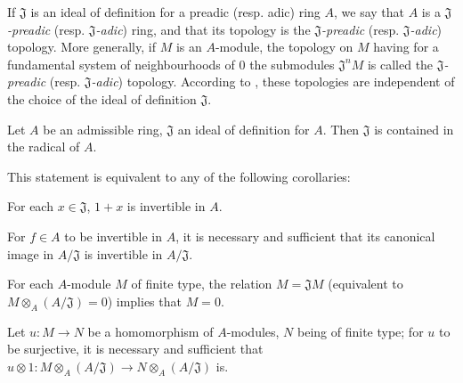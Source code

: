 If $\mathfrak{J}$ is an ideal of definition for a preadic (resp. adic) ring
$A$, we say that $A$ is a \emph{$\mathfrak{J}$-preadic}
(resp. \emph{$\mathfrak{J}$-adic}) ring, and that its topology is the
\emph{$\mathfrak{J}$-preadic} (resp. \emph{$\mathfrak{J}$-adic}) topology. More
generally, if $M$ is an $A$-module, the topology on $M$ having for a fundamental
system of neighbourhoods of $0$ the submodules $\mathfrak{J}^n M$ is called the
\emph{$\mathfrak{J}$-preadic} (resp. \emph{$\mathfrak{J}$-adic}) topology.
According to , these topologies are independent of the choice
of the ideal of definition $\mathfrak{J}$.

\begin{proposition}[7.1.10]
\label{0.7.1.10}
Let $A$ be an admissible ring, $\mathfrak{J}$ an ideal of definition for $A$.
Then $\mathfrak{J}$ is contained in the radical of $A$.
\end{proposition}

This statement is equivalent to any of the following corollaries:
\begin{corollary}[7.1.11]
\label{0.7.1.11}
For each $x\in\mathfrak{J}$, $1+x$ is invertible in $A$.
\end{corollary}

\begin{corollary}[7.1.12]
\label{0.7.1.12}
For $f\in A$ to be invertible in $A$, it is necessary and sufficient that its
canonical image in $A/\mathfrak{J}$ is invertible in $A/\mathfrak{J}$.
\end{corollary}

\begin{corollary}[7.1.13]
\label{0.7.1.13}
For each $A$-module $M$ of finite type, the relation $M=\mathfrak{J}M$
(equivalent to $M\otimes_A(A/\mathfrak{J})=0$) implies that $M=0$.
\end{corollary}

\begin{corollary}[7.1.14]
\label{0.7.1.14}
Let $u:M\to N$ be a homomorphism of $A$-modules, $N$ being of finite type; for
$u$ to be surjective, it is necessary and sufficient that
$u\otimes 1:M\otimes_A(A/\mathfrak{J})\to N\otimes_A(A/\mathfrak{J})$ is.
\end{corollary}

